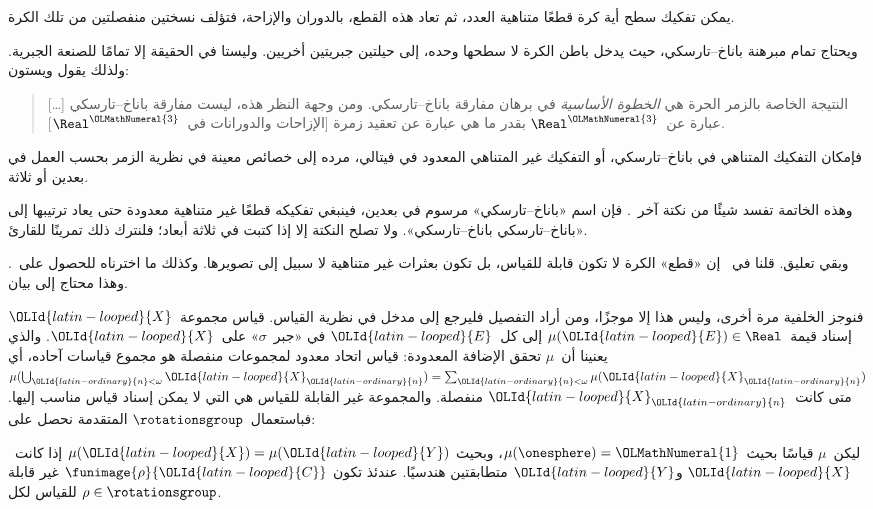 \documentclass[../../../include/open-logic-section]{subfiles}
\begin{document}
\begin{thm}
يمكن تفكيك سطح أية كرة قطعًا متناهية العدد، ثم تعاد هذه القطع، بالدوران
والإزاحة، فتؤلف نسختين منفصلتين من تلك الكرة.
\end{thm}

ويحتاج تمام مبرهنة باناخ--تارسكي، حيث يدخل باطن الكرة لا سطحها وحده،
إلى حيلتين جبريتين أخريين. وليستا في الحقيقة إلا تمامًا للصنعة
الجبرية. ولذلك يقول ويستون:
\begin{quote}	
  [\ldots] النتيجة الخاصة بالزمر الحرة هي \emph{الخطوة الأساسية} في
  برهان مفارقة باناخ--تارسكي. ومن وجهة النظر هذه، ليست مفارقة
  باناخ--تارسكي عبارة عن~$\Real^{\OLMathNumeral{3}}$ بقدر ما هي عبارة عن تعقيد زمرة
  [الإزاحات والدورانات في~$\Real^{\OLMathNumeral{3}}$]. \cite[p.~16]{Weston2003}
\end{quote}
فإمكان التفكيك المتناهي في باناخ--تارسكي، أو التفكيك غير المتناهي
المعدود في فيتالي، مرده إلى خصائص معينة في نظرية الزمر بحسب العمل في
بعدين أو ثلاثة.

وهذه الخاتمة تفسد شيئًا من نكتة آخر~. فإن اسم
«باناخ--تارسكي» مرسوم في بعدين، فينبغي تفكيكه قطعًا غير متناهية معدودة
حتى يعاد ترتيبها إلى «باناخ--تارسكي باناخ--تارسكي». ولا تصلح النكتة
إلا إذا كتبت في ثلاثة أبعاد؛ فلنترك ذلك تمرينًا للقارئ.

وبقي تعليق. قلنا في~ إن «قطع» الكرة لا تكون قابلة
للقياس، بل تكون بعثرات غير متناهية لا سبيل إلى تصويرها. وكذلك ما
اخترناه للحصول على~. وهذا محتاج إلى بيان.

فنوجز الخلفية مرة أخرى، وليس هذا إلا موجزًا، ومن أراد التفصيل فليرجع
إلى مدخل في نظرية القياس. قياس مجموعة~${\OLId{latin-looped}{X}}$ إسناد قيمة~$\mu({\OLId{latin-looped}{E}}) \in \Real$
إلى كل~${\OLId{latin-looped}{E}}$ في «جبر~$\sigma$» على~${\OLId{latin-looped}{X}}$. والذي يعنينا أن~$\mu$ تحقق
الإضافة المعدودة: قياس اتحاد معدود لمجموعات منفصلة هو مجموع قياسات
آحاده، أي
$\mu(\bigcup_{{\OLId{latin-ordinary}{n}} < \omega} {\OLId{latin-looped}{X}}_{\OLId{latin-ordinary}{n}}) = \sum_{{\OLId{latin-ordinary}{n}} < \omega}\mu({\OLId{latin-looped}{X}}_{\OLId{latin-ordinary}{n}})$ متى
كانت~${\OLId{latin-looped}{X}}_{\OLId{latin-ordinary}{n}}$ منفصلة. والمجموعة غير القابلة للقياس هي التي لا يمكن إسناد
قياس مناسب إليها. فباستعمال~$\rotationsgroup$ المتقدمة نحصل على:

\begin{cor}[فيتالي]
ليكن~$\mu$ قياسًا بحيث~$\mu(\onesphere) = {\OLMathNumeral{1}}$، وبحيث
$\mu({\OLId{latin-looped}{X}}) = \mu({\OLId{latin-looped}{Y}})$ إذا كانت~${\OLId{latin-looped}{X}}$ و${\OLId{latin-looped}{Y}}$ متطابقتين هندسيًا. عندئذ تكون
$\funimage{\rho}{{\OLId{latin-looped}{C}}}$ غير قابلة للقياس لكل
$\rho \in \rotationsgroup$.
\end{cor}
\end{document}
